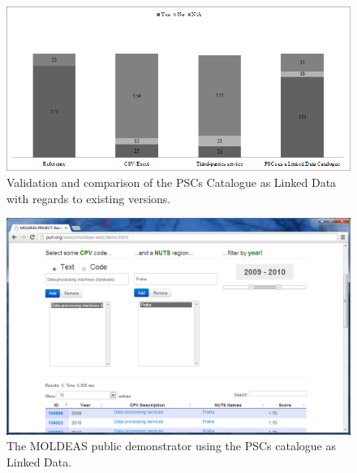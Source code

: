  \begin{figure}[!ht]
\centering
	\includegraphics[width=12cm]{./imgs/fig-4}
 \caption{Validation and comparison of the PSCs Catalogue as Linked Data with regards to existing versions.}
 \label{fig:results-4}
\end{figure}




 \begin{figure}[!ht]
\centering
	\includegraphics[width=12cm]{./imgs/moldeas-snapshot}
 \caption{The MOLDEAS public demonstrator using the PSCs catalogue as Linked Data.}
 \label{fig:moldeas-snap}
\end{figure}
